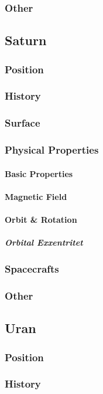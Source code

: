 \subsubsection{Other}

\subsection{Saturn}
\subsubsection{Position}
\subsubsection{History}
\subsubsection{Surface}
\subsubsection{Physical Properties}
\paragraph{Basic Properties}
\paragraph{Magnetic Field}
\paragraph{Orbit \& Rotation}
\subparagraph{Orbital Exxentritet}
\subsubsection{Spacecrafts}
\subsubsection{Other}

\subsection{Uran}
\subsubsection{Position}
\subsubsection{History}
